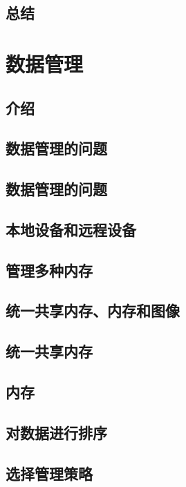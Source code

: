 \documentclass[11pt,a4paper,UTF8]{ctexart}
\begin{document}
		\subsection{总结}
	\section{数据管理}
		\subsection{介绍}
		\subsection{数据管理的问题}
		\subsection{数据管理的问题}
		\subsection{本地设备和远程设备}
		\subsection{管理多种内存}
		\subsection{统一共享内存、内存和图像}
		\subsection{统一共享内存}
		\subsection{内存}
		\subsection{对数据进行排序}
		\subsection{选择管理策略}
\end{document}
